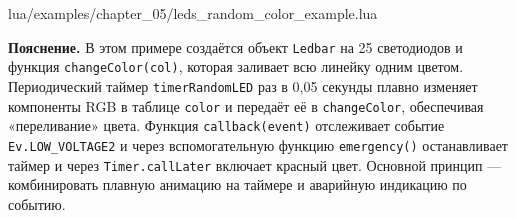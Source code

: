 \begin{codefile}{lua/examples/chapter_05/leds_random_color_example.lua}
\end{codefile}

\textbf{Пояснение.} В этом примере создаётся объект \verb|Ledbar| на 25 светодиодов и функция \verb|changeColor(col)|, которая заливает всю линейку одним цветом. Периодический таймер \verb|timerRandomLED| раз в 0{,}05 секунды плавно изменяет компоненты RGB в таблице \verb|color| и передаёт её в \verb|changeColor|, обеспечивая «переливание» цвета. Функция \verb|callback(event)| отслеживает событие \verb|Ev.LOW_VOLTAGE2| и через вспомогательную функцию \verb|emergency()| останавливает таймер и через \verb|Timer.callLater| включает красный цвет. Основной принцип — комбинировать плавную анимацию на таймере и аварийную индикацию по событию.
